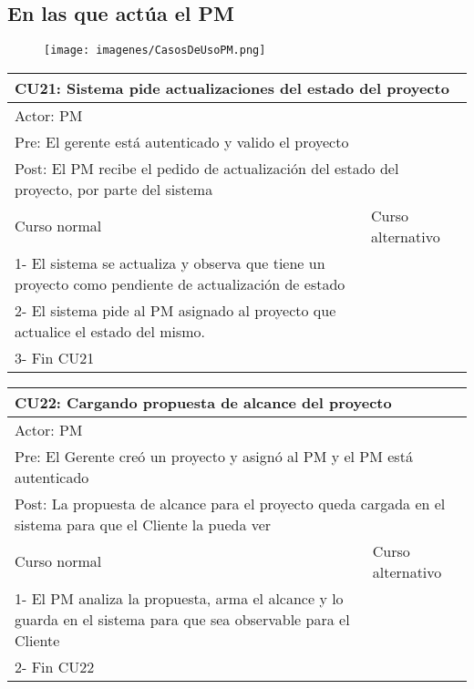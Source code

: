 \subsection{En las que actúa el PM}

\begin{figure}[H]
    \texttt{[image: imagenes/CasosDeUsoPM.png]}
\end{figure}

\begin{table}[H]
  \begin{adjustbox}{max width = \textwidth}
  \begin{tabular}{|l|l|}
    \hline
    \multicolumn{2}{|l|}{CU21: Sistema pide actualizaciones del estado del proyecto} \\\hline
    \multicolumn{2}{|l|}{Actor: PM} \\\hline
    \multicolumn{2}{|l|}{Pre: El gerente está autenticado y valido el proyecto} \\\hline
    \multicolumn{2}{|l|}{Post: El PM recibe el pedido de actualización del estado del proyecto, por parte del sistema} \\\hline
     Curso normal & Curso alternativo\\ \hline
     1- El sistema se actualiza y observa que tiene un proyecto como pendiente de actualización de estado & \\ \hline
     2- El sistema pide al PM asignado al proyecto que actualice el estado del mismo. &\\ \hline
     3- Fin CU21 & \\ \hline
 \end{tabular}
  \end{adjustbox}
\end{table}

\begin{table}[H]
  \begin{adjustbox}{max width = \textwidth}
  \begin{tabular}{|l|l|}
    \hline
    \multicolumn{2}{|l|}{CU22: Cargando propuesta de alcance del proyecto} \\\hline
    \multicolumn{2}{|l|}{Actor: PM} \\\hline
    \multicolumn{2}{|l|}{Pre: El Gerente creó un proyecto y asignó al PM y el PM está autenticado} \\\hline
    \multicolumn{2}{|l|}{Post: La propuesta de alcance para el proyecto queda cargada en el sistema para que el Cliente la pueda ver} \\\hline
     Curso normal & Curso alternativo\\ \hline
     1- El PM analiza la propuesta, arma el alcance y lo guarda en el sistema para que sea observable para el Cliente & \\ \hline
     2- Fin CU22 & \\ \hline
 \end{tabular}
  \end{adjustbox}
\end{table}


